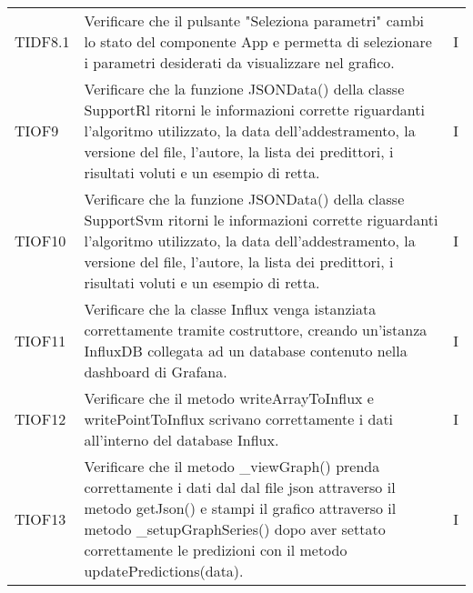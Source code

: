 \begin{longtable}{C{2cm} L{8cm} C{2cm}}
TIDF8.1 & Verificare che il pulsante "Seleziona parametri" cambi lo stato del componente App e permetta di selezionare i parametri desiderati da visualizzare nel grafico. & I \\
TIOF9 & Verificare che la funzione JSONData() della classe SupportRl ritorni le informazioni corrette riguardanti l'algoritmo utilizzato, la data dell'addestramento, la versione del file, l'autore, la lista dei predittori, i risultati voluti e un esempio di retta. & I \\
TIOF10 & Verificare che la funzione JSONData() della classe SupportSvm ritorni le informazioni corrette riguardanti l'algoritmo utilizzato, la data dell'addestramento, la versione del file, l'autore, la lista dei predittori, i risultati voluti e un esempio di retta. & I \\
TIOF11 & Verificare che la classe Influx venga istanziata correttamente tramite costruttore, creando un’istanza InfluxDB collegata ad un database contenuto nella dashboard di Grafana. & I \\
TIOF12 & Verificare che il metodo writeArrayToInflux e writePointToInflux scrivano correttamente i dati all'interno del database Influx. & I \\
TIOF13 & Verificare che il metodo \_viewGraph() prenda correttamente i dati dal dal file json attraverso il metodo getJson() e stampi il grafico attraverso il metodo \_setupGraphSeries() dopo aver settato correttamente le predizioni con il metodo updatePredictions(data). & I \\
\end{longtable}
\pagebreak
